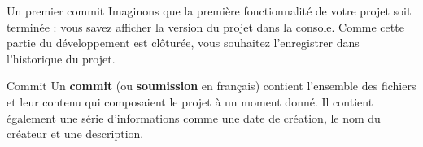 \documentclass[a4paper,11pt]{style-esi/td}
\begin{document}
\newpage
\begin{Tutoriel}{Un premier commit}
	Imaginons que la première fonctionnalité de votre projet soit terminée : 
	vous savez afficher la version du projet dans la console.
	Comme cette partie du développement est clôturée, 
	vous souhaitez l'enregistrer dans l'historique du projet.

	\begin{infoit}{Commit}
		Un \textbf{commit} (ou \textbf{soumission} en français)
		contient l’ensemble des fichiers et leur contenu qui composaient
		le projet à un moment donné. 
		Il contient également une série d'informations
		comme une date de création, le nom du créateur et une description. 
	\end{infoit}


\end{Tutoriel}
\end{document}
